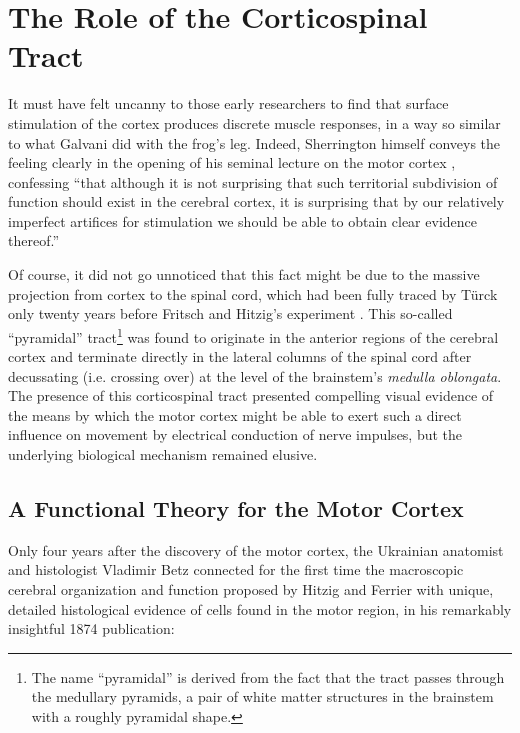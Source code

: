 \section{The Role of the Corticospinal Tract}

It must have felt uncanny to those early researchers to find that surface stimulation of the cortex produces discrete muscle responses, in a way so similar to what Galvani did with the frog's leg. Indeed, Sherrington himself conveys the feeling clearly in the opening of his seminal lecture on the motor cortex \cite[p.271]{Sherrington1906}, confessing ``that although it is not surprising that such territorial subdivision of function should exist in the cerebral cortex, it is surprising that by our relatively imperfect artifices for stimulation we should be able to obtain clear evidence thereof.''

Of course, it did not go unnoticed that this fact might be due to the massive projection from cortex to the spinal cord, which had been fully traced by Türck only twenty years before Fritsch and Hitzig's experiment \cite{Nathan1955}. This so-called ``pyramidal'' tract\footnote{The name ``pyramidal'' is derived from the fact that the tract passes through the medullary pyramids, a pair of white matter structures in the brainstem with a roughly pyramidal shape.} was found to originate in the anterior regions of the cerebral cortex and terminate directly in the lateral columns of the spinal cord after decussating (i.e. crossing over) at the level of the brainstem's \emph{medulla oblongata}. The presence of this corticospinal tract presented compelling visual evidence of the means by which the motor cortex might be able to exert such a direct influence on movement by electrical conduction of nerve impulses, but the underlying biological mechanism remained elusive.

\subsection{A Functional Theory for the Motor Cortex}

Only four years after the discovery of the motor cortex, the Ukrainian anatomist and histologist Vladimir Betz connected for the first time the macroscopic cerebral organization and function proposed by Hitzig and Ferrier with unique, detailed histological evidence of cells found in the motor region, in his remarkably insightful 1874 publication:

